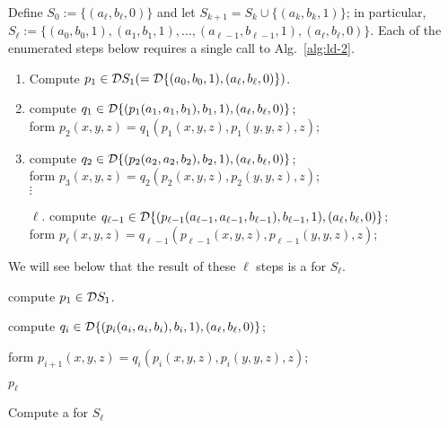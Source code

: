   Define $S_0 := \{(a_{\ell}, b_{\ell},0)\}$ and let
  $S_{k+1} = S_{k} \cup \{(a_k, b_k, 1)\}$; in particular,
  $S_\ell := \{(a_0, b_0, 1), (a_1, b_1, 1), \dots,(a_{\ell-1}, b_{\ell-1},1), (a_{\ell}, b_{\ell},0)\}$.
  Each of the enumerated steps below requires a single call to Alg.~\ref{alg:ld-2}.
  \begin{enumerate}[1.]
    \item Compute $p_1 \in \mathcal{D} S_1 ( = \mathcal{D} \{(a_0, b_0, 1), (a_{\ell}, b_{\ell},0)\})$.
    \item compute $q_1\in \mathcal{D} \{(p_1(a_1, a_1, b_1), b_1, 1), (a_{\ell}, b_{\ell},0)\}$; \\
    form $p_2(x,y,z) = q_1(p_1(x,y,z), p_1(y,y,z), z)$; %
    \item compute $q_2\in \mathcal{D} \{(p_2(a_2, a_2, b_2), b_2, 1), (a_{\ell}, b_{\ell},0)\}$; \\
      form $p_3(x,y,z) = q_2(p_2(x,y,z), p_2(y,y,z), z)$;\\ %
    $\vdots$
    \item[$\ell$.] compute $q_{\ell-1}\in \mathcal{D} \{ (p_{\ell-1}(a_{\ell-1}, a_{\ell-1}, b_{\ell-1}), b_{\ell-1}, 1), (a_{\ell}, b_{\ell},0)\}$; \\
    form
    $p_\ell(x,y,z) = q_{\ell-1}(p_{\ell-1}(x,y,z), p_{\ell-1}(y,y,z), z)$;
  \end{enumerate}
  We will see below that the result of these $\ell$ steps is a \ldto for $S_\ell$.
  \begin{algorithm}

    compute $p_1 \in \mathcal{D} S_1$. %

     {
      compute $q_i\in \mathcal{D} \{(p_i(a_i, a_i, b_i), b_i, 1), (a_{\ell}, b_{\ell},0)\}$;

      form $p_{i+1}(x,y,z) = q_i(p_i(x,y,z), p_i(y,y,z), z)$;
    }

    \Return $p_\ell$
    \caption{Compute a \ldto for $S_\ell$\label{alg:new-2-1}}
  \end{algorithm}







